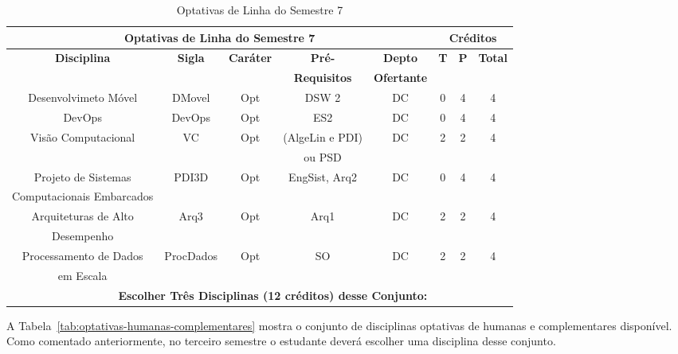 \begin{table}[H]
\caption{Optativas de Linha do Semestre 7}
\centering
\footnotesize
\begin{tabular}{|c|c|c|c|c|c|c|c|} %
\hline
\hline
\multicolumn{5}{|c|}{\textbf{Optativas de Linha do Semestre 7}}  &  \multicolumn{3}{|c|}{\textbf{Créditos}} \\
\hline
\hline
\textbf{Disciplina} & \textbf{Sigla} & \textbf{Caráter} & \textbf{Pré-} & \textbf{Depto} &  \textbf{T}  &  \textbf{P}  & \textbf{Total} \\ 
& & & \textbf{Requisitos}  & \textbf{Ofertante} & & & \\
\hline 
Desenvolvimeto Móvel & DMovel & Opt & DSW 2 & DC & 0 & 4 & 4 \\
\hline
DevOps & DevOps & Opt & ES2 & DC & 0 & 4 & 4 \\
\hline
Visão Computacional & VC & Opt & (AlgeLin e PDI) & DC & 2 & 2 & 4 \\
& & & ou PSD & & & &  \\
\hline
Projeto de Sistemas & PDI3D & Opt & EngSist, Arq2  & DC & 0 & 4 & 4 \\
Computacionais Embarcados & & & & & & & \\  
\hline
Arquiteturas de Alto & Arq3 & Opt & Arq1 & DC & 2 & 2 & 4 \\
Desempenho & & & & & & & \\
\hline
Processamento de Dados & ProcDados & Opt & SO & DC & 2 & 2 & 4 \\
em Escala & & & & & & & \\
\hline
\hline
\multicolumn{5}{|r|}{\textbf{Escolher Três Disciplinas (12 créditos) desse Conjunto:}}  &    &     &  \\ %
\hline
\hline
\end{tabular}
\label{tab:OptTrilha-Semestre7}
\end{table}














\doublespacing

A Tabela~\ref{tab:optativas-humanas-complementares} mostra o conjunto de disciplinas optativas de humanas e complementares disponível. Como comentado anteriormente, no terceiro semestre o estudante deverá escolher uma disciplina desse conjunto. 


